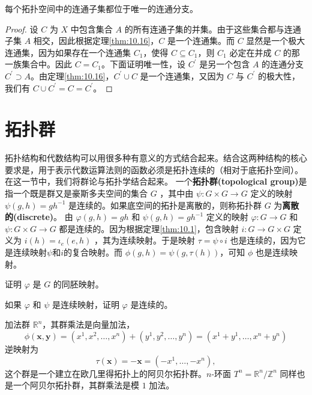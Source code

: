 \begin{theorem}\label{thm:10.19} 
	每个拓扑空间中的连通子集都位于唯一的连通分支。
\end{theorem}

\begin{proof}
	设 $C$ 为 $X$ 中包含集合 $A$ 的所有连通子集的并集。由于这些集合都与连通子集 $A$ 相交，因此根据定理\ref{thm:10.16}，$C$ 是一个连通集。而 $C$ 显然是一个极大连通集，因为如果存在一个连通集 $C_{1}$，使得 $C\subseteq C_{1}$，则 $C_{1}$ 必定在并成 $C$ 的那一族集合中。因此 $C=C_{1}$。下面证明唯一性，设 $C^{\prime}$ 是另一个包含 $A$ 的连通分支 $C^{\prime}\supset A$。由定理\ref{thm:10.16}，$C^{\prime}\cup C$ 是一个连通集，又因为 $C$ 与 $C^{\prime}$ 的极大性，我们有 $C\cup C^{\prime}=C=C^{\prime}$。
\end{proof}

\section{拓扑群}

拓扑结构和代数结构可以用很多种有意义的方式结合起来。结合这两种结构的核心要求是，用于表示代数运算法则的函数必须是拓扑连续的（相对于底拓扑空间）。在这一节中，我们将群论与拓扑学结合起来。
	一个\textbf{拓扑群(topological group)}是指一个既是群又是豪斯多夫空间的集合 $ G$ ，其中由 $\psi :G\times G\rightarrow G$ 定义的映射 $\psi (g,h)=gh^{-1}$ 是连续的。如果底空间的拓扑是离散的，则称拓扑群 $G$ 为\textbf{离散的(discrete)}。
	由 $\varphi (g,h)=gh$ 和 $\psi (g,h)=gh^{-1}$ 定义的映射 $\varphi :G\rightarrow G$ 和 $\psi :G\times G\rightarrow G$ 都是连续的。因为根据定理\ref{thm:10.1}，包含映射 $i:G\rightarrow G\times G$ 定义为 $i(h)=\iota _{e} (e,h)$ ，其为连续映射。于是映射 $\tau =\psi \circ i$ 也是连续的，因为它是连续映射$ \psi $和$ i$的复合映射。而 $\phi ( g,h) =\psi (g,\tau (h))$，可知 $\phi $ 也是连续映射。

\begin{exercise}
	证明 $\varphi $ 是 $G$ 的同胚映射。
\end{exercise}

\begin{exercise}
	如果 $\varphi $ 和 $\psi $ 是连续映射，证明 $\varphi $ 是连续的。
\end{exercise}

\begin{eg}\label{eg:10.20}
加法群 $\mathbb{R}^{n}$，其群乘法是向量加法，
\begin{equation*}
    \phi (\mathbf{x} ,\mathbf{y}) =(x^{1} ,x^{2} ,\dotsc ,x^{n} )+(y^{1} ,y^{2} ,\dotsc ,y^{n} )=(x^{1} +y^{1} ,\dotsc ,x^{n} +y^{n} )
\end{equation*}
逆映射为
\begin{equation*}
    \tau (\mathbf{x} )=-\mathbf{x} =(-x^{1} ,\dotsc ,-x^{n} ),
\end{equation*}
这个群是一个建立在欧几里得拓扑上的阿贝尔拓扑群。$n$-环面 $T^{n} =\mathbb{R}^{n} /\mathbb{Z}^{n}$ 同样也是一个阿贝尔拓扑群，其群乘法是模 $ 1$ 加法。
\end{eg}

